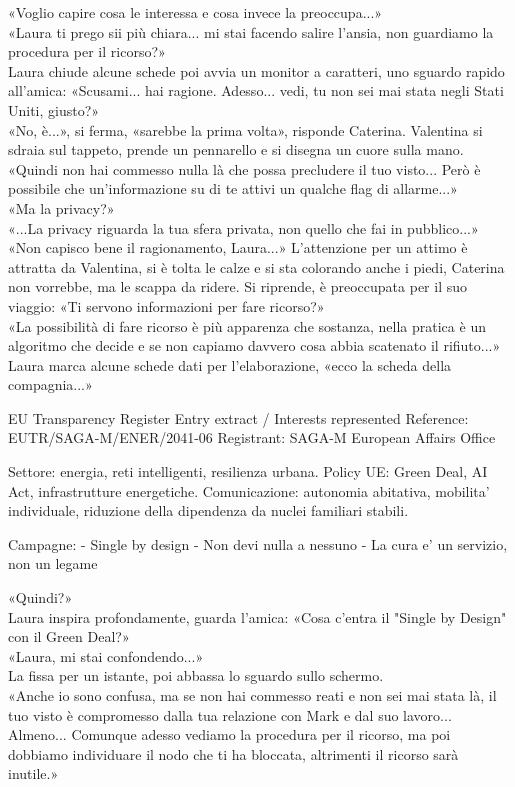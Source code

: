 «Voglio capire cosa le interessa e cosa invece la preoccupa...»\\
«Laura ti prego sii pi\`u chiara... mi stai facendo salire l'ansia, non guardiamo la procedura per il ricorso?»\\
Laura chiude alcune schede poi avvia un monitor a caratteri, uno sguardo rapido all'amica: «Scusami... hai ragione. Adesso... vedi, tu non sei mai stata negli Stati Uniti, giusto?»\\
«No, \`e...», si ferma, «sarebbe la prima volta», risponde Caterina. Valentina si sdraia sul tappeto, prende un pennarello e si disegna un cuore sulla mano.\\
«Quindi non hai commesso nulla l\`a che possa precludere il tuo visto... Però \`e possibile che un'informazione su di te attivi un qualche flag di allarme...»\\
«Ma la privacy?»\\
«...La privacy riguarda la tua sfera privata, non quello che fai in pubblico...»\\
«Non capisco bene il ragionamento, Laura...» L'attenzione per un attimo \`e attratta da Valentina, si \`e tolta le calze e si sta colorando anche i piedi, Caterina non vorrebbe, ma le scappa da ridere. Si riprende, \`e preoccupata per il suo viaggio: «Ti servono informazioni per fare ricorso?»\\
«La possibilità di fare ricorso \`e pi\`u apparenza che sostanza, nella pratica \`e un algoritmo che decide e se non capiamo davvero cosa abbia scatenato il rifiuto...»
Laura marca alcune schede dati per l'elaborazione, «ecco la scheda della compagnia...»\\
\begin{terminalbox}
EU Transparency Register
Entry extract / Interests represented
Reference: EUTR/SAGA-M/ENER/2041-06
Registrant: SAGA-M European Affairs Office

Settore: energia, reti intelligenti,
resilienza urbana.
Policy UE: Green Deal, AI Act,
infrastrutture energetiche.
Comunicazione: autonomia abitativa, mobilita' individuale,
riduzione della dipendenza da nuclei
familiari stabili.

Campagne:
- Single by design
- Non devi nulla a nessuno
- La cura e' un servizio, non un legame
\end{terminalbox}

«Quindi?»\\
Laura inspira profondamente, guarda l'amica:
«Cosa c'entra il "Single by Design" con il Green Deal?»\\
«Laura, mi stai confondendo...»\\

La fissa per un istante, poi abbassa lo sguardo sullo schermo.\\

«Anche io sono confusa, ma se non hai commesso reati e non sei mai stata l\`a, il tuo visto \`e compromesso dalla tua relazione con Mark e dal suo lavoro... Almeno... Comunque adesso vediamo la procedura per il ricorso, ma poi dobbiamo individuare il nodo che ti ha bloccata, altrimenti il ricorso sarà inutile.»

